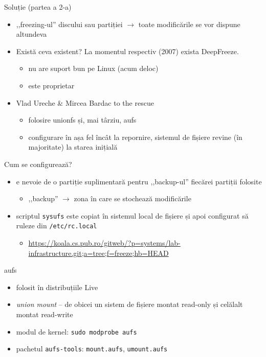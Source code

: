 \documentclass{beamer}
\begin{document}
\begin{frame}{Soluție (partea a 2-a)}
  \begin{itemize}
    \item ,,freezing-ul'' discului sau partiției $\rightarrow$ toate
      modificările se vor dispune altundeva
    \item Există ceva existent? La momentul respectiv (2007) exista
      DeepFreeze.
      \begin{itemize}
        \item nu are suport bun pe Linux (acum deloc)
        \item este proprietar
      \end{itemize}
    \item Vlad Ureche \& Mircea Bardac to the rescue
      \begin{itemize}
        \item folosire unionfs și, mai târziu, aufs
        \item configurare în așa fel încât la repornire, sistemul de fișiere
          revine (în majoritate) la starea inițială
      \end{itemize}
  \end{itemize}
\end{frame}

\begin{frame}{Cum se configurează?}
  \begin{itemize}
    \item e nevoie de o partiție suplimentară pentru ,,backup-ul'' fiecărei
      partiții folosite
      \begin{itemize}
        \item ,,backup'' $\rightarrow$ zona în care se stochează modificările
      \end{itemize}
    \item scriptul \texttt{sysufs} este copiat în sistemul local de fișiere și
      apoi configurat să ruleze din \texttt{/etc/rc.local}
      \begin{itemize}
        \item \url{https://koala.cs.pub.ro/gitweb/?p=systems/lab-infrastructure.git;a=tree;f=freeze;hb=HEAD}
      \end{itemize}
  \end{itemize}
\end{frame}

\begin{frame}{aufs}
  \begin{itemize}
    \item folosit în distribuțiile Live
    \item \textit{union mount} -- de obicei un sistem de fișiere montat
      read-only și celălalt montat read-write
    \item modul de kernel: \texttt{sudo modprobe aufs}
    \item pachetul \texttt{aufs-tools}: \texttt{mount.aufs},
      \texttt{umount.aufs}
  \end{itemize}
\end{frame}
\end{document}

